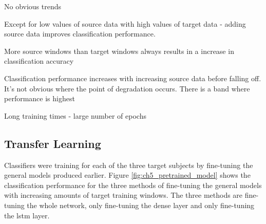 

No obvious trends

Except for low values of source data with high values of target data - adding source data improves classification performance. 

More source windows than target windows always results in a increase in classification accuracy

Classification performance increases with increasing source data before falling off. It's not obvious where the point of degradation occurs. There is a band where performance is highest

Long training times - large number of epochs

\subsection{Transfer Learning}
Classifiers were training for each of the three target subjects by fine-tuning the general models produced earlier. Figure \ref{fig:ch5_pretrained_model} shows the classification performance for the three methods of fine-tuning the general models with increasing amounts of target training windows. The three methods are fine-tuning the whole network, only fine-tuning the dense layer and only fine-tuning the \acrshort{lstm} layer.

